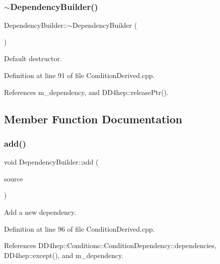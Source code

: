 \subsubsection{\texorpdfstring{$\sim$\+Dependency\+Builder()}{~DependencyBuilder()}}
{\footnotesize\ttfamily Dependency\+Builder\+::$\sim$\+Dependency\+Builder (\begin{DoxyParamCaption}{ }\end{DoxyParamCaption})\hspace{0.3cm}{\ttfamily [virtual]}}



Default destructor. 



Definition at line 91 of file Condition\+Derived.\+cpp.



References m\+\_\+dependency, and D\+D4hep\+::release\+Ptr().



\subsection{Member Function Documentation}
\hypertarget{class_d_d4hep_1_1_conditions_1_1_dependency_builder_afbfb0aa5a9cd8a969588d705cca795e5}{}\label{class_d_d4hep_1_1_conditions_1_1_dependency_builder_afbfb0aa5a9cd8a969588d705cca795e5} 
\subsubsection{\texorpdfstring{add()}{add()}}
{\footnotesize\ttfamily void Dependency\+Builder\+::add (\begin{DoxyParamCaption}\item[{const \hyperlink{class_d_d4hep_1_1_conditions_1_1_condition_key}{Condition\+Key} \&}]{source }\end{DoxyParamCaption})}



Add a new dependency. 



Definition at line 96 of file Condition\+Derived.\+cpp.



References D\+D4hep\+::\+Conditions\+::\+Condition\+Dependency\+::dependencies, D\+D4hep\+::except(), and m\+\_\+dependency.

